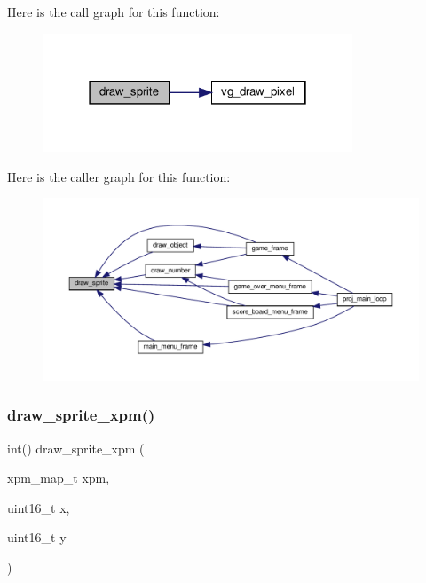 Here is the call graph for this function\+:
\nopagebreak
\begin{figure}[H]
\begin{center}
\leavevmode
\includegraphics[width=262pt]{group__graphics_ga7f31f56ddc44fb5e02130bbe4a6c3927_cgraph}
\end{center}
\end{figure}
Here is the caller graph for this function\+:
\nopagebreak
\begin{figure}[H]
\begin{center}
\leavevmode
\includegraphics[width=350pt]{group__graphics_ga7f31f56ddc44fb5e02130bbe4a6c3927_icgraph}
\end{center}
\end{figure}
\mbox{\label{group__graphics_gaf7d28831f1ffad3816101e473a54b9be}} 
\subsubsection{\texorpdfstring{draw\+\_\+sprite\+\_\+xpm()}{draw\_sprite\_xpm()}}
{\footnotesize\ttfamily int() draw\+\_\+sprite\+\_\+xpm (\begin{DoxyParamCaption}\item[{xpm\+\_\+map\+\_\+t}]{xpm,  }\item[{uint16\+\_\+t}]{x,  }\item[{uint16\+\_\+t}]{y }\end{DoxyParamCaption})}



